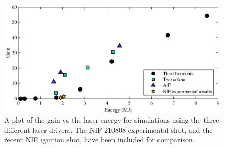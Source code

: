 \begin{figure}[ht]
\centering
\includegraphics{figures/FurtherSims/ArFandTwoColour.eps}
\caption{A plot of the gain vs the laser energy for simulations using the three different laser drivers. The NIF 210808 experimental shot, and the recent NIF ignition shot, have been included for comparison.}
\label{fig:ArF and Two colour}
\end{figure}

